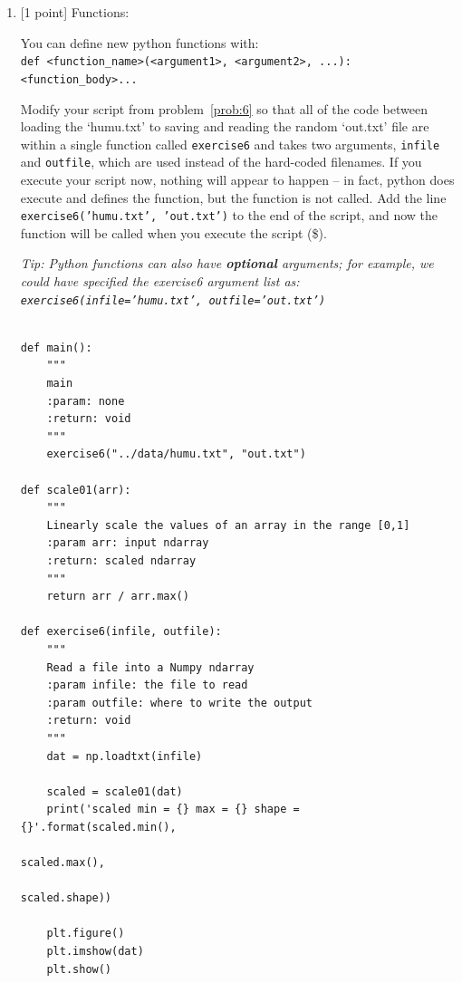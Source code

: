 \documentclass[10pt]{article}
\begin{document}
\begin{enumerate}
\begin{figure}
\end{figure}

\pagebreak

\item \label{prob:7} [1 point]
Functions:

You can define new python functions with:\\
\hspace*{1cm} {\tt def <function\_name>(<argument1>, <argument2>, ...):}\\
\hspace*{1cm}\hspace{2em} {\tt <function\_body>...}

Modify your script from problem~\ref{prob:6} so that all of the code between loading the `humu.txt' to saving and reading the random `out.txt' file are within a single function called {\tt exercise6} and takes two arguments, {\tt infile} and {\tt outfile}, which are used instead of the hard-coded filenames.  If you execute your script now, nothing will appear to happen -- in fact, python does execute and defines the function, but the function is not called.  Add the line {\tt exercise6('humu.txt', 'out.txt')} to the end of the script, and now the function will be called when you execute the script (\$).

{\em Tip: Python functions can also have {\bf optional} arguments; for example, we could have specified the exercise6 argument list as: {\tt exercise6(infile='humu.txt', outfile='out.txt')}}

\begin{verbatim}

def main():
    """
    main
    :param: none
    :return: void
    """
    exercise6("../data/humu.txt", "out.txt")

def scale01(arr):
    """
    Linearly scale the values of an array in the range [0,1]
    :param arr: input ndarray
    :return: scaled ndarray
    """
    return arr / arr.max()
    
def exercise6(infile, outfile):
    """
    Read a file into a Numpy ndarray
    :param infile: the file to read
    :param outfile: where to write the output
    :return: void
    """
    dat = np.loadtxt(infile)

    scaled = scale01(dat)
    print('scaled min = {} max = {} shape = {}'.format(scaled.min(),
                                                       scaled.max(),
                                                       scaled.shape))

    plt.figure()
    plt.imshow(dat)
    plt.show()


\end{verbatim}
\end{enumerate}
\end{document}
